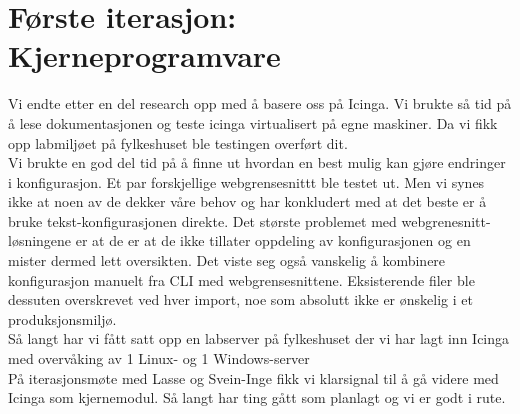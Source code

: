 
\date{Onsdag 13. Februar 2013}



\maketitle
\section*{Første iterasjon: Kjerneprogramvare}

Vi endte etter en del research opp med å basere oss på Icinga. Vi brukte så tid på å lese dokumentasjonen og teste icinga virtualisert på egne maskiner. Da vi fikk opp labmiljøet på fylkeshuset ble testingen overført dit. \\

\noindent Vi brukte en god del tid på å finne ut hvordan en best mulig kan gjøre endringer i konfigurasjon. Et par forskjellige webgrensesnittt ble testet ut. Men vi synes ikke at noen av de dekker våre behov og har konkludert med at det beste er å bruke tekst-konfigurasjonen direkte. Det største problemet med webgrenesnitt-løsningene er at de er at de ikke tillater oppdeling av konfigurasjonen og en mister dermed lett oversikten. Det viste seg også vanskelig å kombinere konfigurasjon manuelt fra CLI med webgrensesnittene. Eksisterende filer ble dessuten overskrevet ved hver import, noe som absolutt ikke er ønskelig i et produksjonsmiljø. \\

\noindent Så langt har vi fått satt opp en labserver på fylkeshuset der vi har lagt inn Icinga med overvåking av 1 Linux- og 1 Windows-server \\

\noindent På iterasjonsmøte med Lasse og Svein-Inge fikk vi klarsignal til å gå videre med Icinga som kjernemodul. Så langt har ting gått som planlagt og vi er godt i rute.


